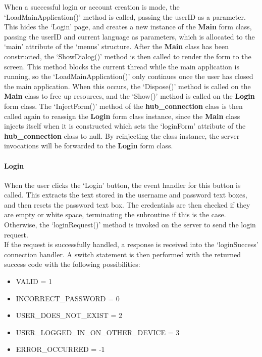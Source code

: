 \documentclass{article}
\begin{document}
When a successful login or account creation is made, the `LoadMainApplication()' method is called, passing the userID as a parameter. This hides the `Login' page, and creates a new instance of the \textbf{Main} form class, passing the userID and current language as parameters, which is allocated to the `main' attribute of the `menus' structure. After the \textbf{Main} class has been constructed, the `ShowDialog()' method is then called to render the form to the screen. This method blocks the current thread while the main application is running, so the `LoadMainApplication()' only continues once the user has closed the main application. When this occurs, the `Dispose()' method is called on the \textbf{Main} class to free up resources, and the `Show()' method is called on the \textbf{Login} form class. The `InjectForm()' method of the \textbf{hub\_connection} class is then called again to reassign the \textbf{Login} form class instance, since the \textbf{Main} class injects itself when it is constructed which sets the `loginForm' attribute of the \textbf{hub\_connection} class to null. By reinjecting the class instance, the server invocations will be forwarded to the \textbf{Login} form class. \\ 

\paragraph{Login\\}

When the user clicks the `Login' button, the event handler for this button is called. This extracts the text stored in the username and password text boxes, and then resets the password text box. The credentials are then checked if they are empty or white space, terminating the subroutine if this is the case. Otherwise, the `loginRequest()' method is invoked on the server to send the login request. \\

If the request is successfully handled, a response is received into the `loginSuccess' connection handler. A switch statement is then performed with the returned success code with the following possibilities:

\begin{itemize}
    \item VALID = 1
    \item INCORRECT\_PASSWORD = 0
    \item USER\_DOES\_NOT\_EXIST = 2
    \item USER\_LOGGED\_IN\_ON\_OTHER\_DEVICE = 3
    \item ERROR\_OCCURRED = -1
\end{itemize}
\end{document}
